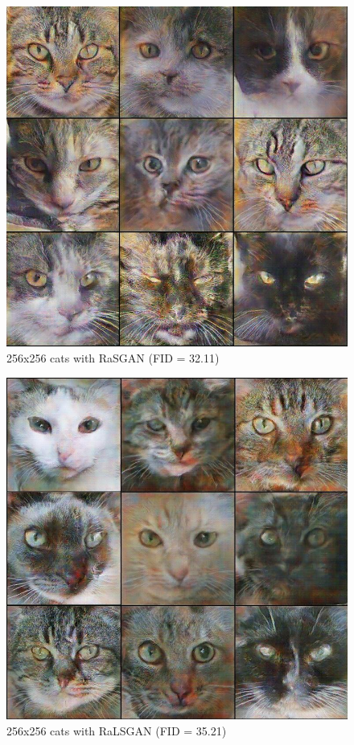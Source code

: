 \documentclass{article}
\begin{document}
\begin{figure}[H]
	\centering
	\includegraphics[width=390pt]{RaSGAN.jpeg}
	\caption{256x256 cats with RaSGAN (FID = 32.11)}
\end{figure}

\begin{figure}[H]
	\centering
	\includegraphics[width=390pt]{RaLSGAN.jpeg}
	\caption{256x256 cats with RaLSGAN (FID = 35.21)}
\end{figure}
\end{document}
